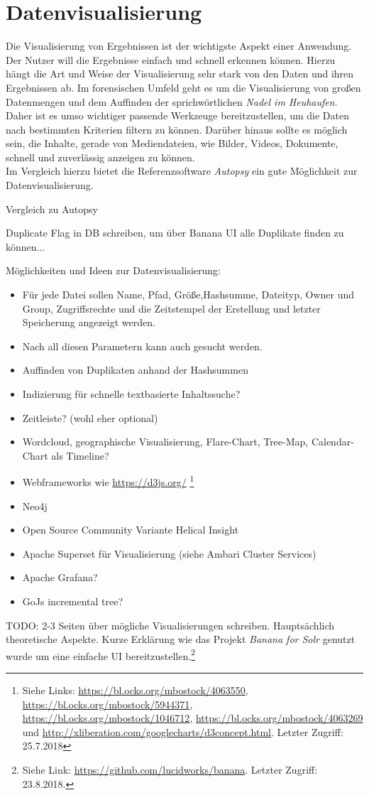 \chapter{Datenvisualisierung}
\label{ch:data_visualization}

Die Visualisierung von Ergebnissen ist der wichtigste Aspekt einer Anwendung. Der Nutzer will die Ergebnisse einfach und schnell erkennen können. Hierzu hängt die Art und Weise der Visualisierung sehr stark von den Daten und ihren Ergebnissen ab. Im forensischen Umfeld geht es um die Visualisierung von großen Datenmengen und dem Auffinden der sprichwörtlichen \textit{Nadel im Heuhaufen}. Daher ist es umso wichtiger passende Werkzeuge bereitzustellen, um die Daten nach bestimmten Kriterien filtern zu können. Darüber hinaus sollte es möglich sein, die Inhalte, gerade von Mediendateien, wie Bilder, Videos, Dokumente, schnell und zuverlässig anzeigen zu können.\\

Im Vergleich hierzu bietet die Referenzsoftware \textit{Autopsy} ein gute Möglichkeit zur Datenvisualisierung.

\noindent
Vergleich zu Autopsy

Duplicate Flag in DB schreiben, um über Banana UI alle Duplikate finden zu können...

Möglichkeiten und Ideen zur Datenvisualisierung:
\begin{itemize}
\item Für jede Datei sollen Name, Pfad, Größe,Hashsumme, Dateityp, Owner und Group, Zugriffsrechte und die Zeitstempel der Erstellung und letzter Speicherung angezeigt werden. 
\item Nach all diesen Parametern kann auch gesucht werden.
\item Auffinden von Duplikaten anhand der Hashsummen
\item Indizierung für schnelle textbasierte Inhaltssuche?
\item Zeitleiste? (wohl eher optional)
\item Wordcloud, geographische Visualisierung, Flare-Chart, Tree-Map, Calendar-Chart als Timeline?
\item Webframeworks wie \url{https://d3js.org/} \footnote{Siehe Links: \url{https://bl.ocks.org/mbostock/4063550}, \url{https://bl.ocks.org/mbostock/5944371}, \url{https://bl.ocks.org/mbostock/1046712}, \url{https://bl.ocks.org/mbostock/4063269} und \url{http://xliberation.com/googlecharts/d3concept.html}. Letzter Zugriff: 25.7.2018}
\item Neo4j
\item Open Source Community Variante Helical Insight
\item Apache Superset für Visualisierung (siehe Ambari Cluster Services)
\item Apache Grafana?
\item GoJs incremental tree?
\end{itemize}


TODO: 2-3 Seiten über mögliche Visualisierungen schreiben. Hauptsächlich theoretische Aspekte. Kurze Erklärung wie das Projekt \textit{Banana for Solr} genutzt wurde um eine
einfache UI bereitzustellen.\footnote{Siehe Link: \url{https://github.com/lucidworks/banana}. Letzter Zugriff: 23.8.2018.}